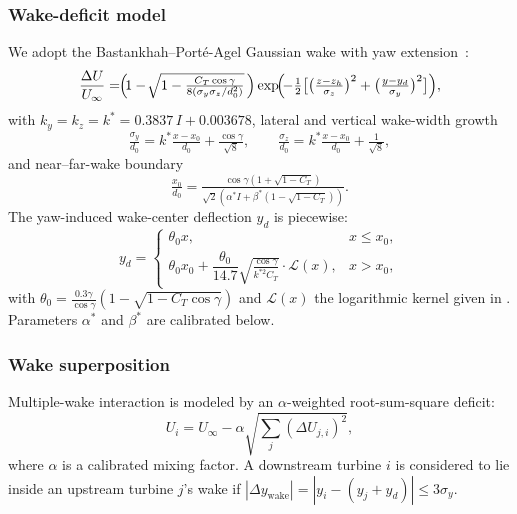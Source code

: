 \documentclass[final,5p,times]{elsarticle}
\begin{document}
\subsubsection{Wake-deficit model}
We adopt the Bastankhah--Port\'e-Agel Gaussian wake with yaw extension~\citep{BastankhahYaw2016}:
\begin{equation}
\frac{\Delta U}{U_\infty}
=\!\!\Bigl(\!1-\!\sqrt{1-\tfrac{C_T\cos\gamma}{8(\sigma_y\sigma_z/d_0^2)}}\,\Bigr)
\exp\!\Bigl(\!-\tfrac{1}{2}\bigl[\bigl(\tfrac{z-z_h}{\sigma_z}\bigr)^{2}
+\bigl(\tfrac{y-y_d}{\sigma_y}\bigr)^{2}\bigr]\Bigr),
\label{eq:wake_deficit}
\end{equation}
with $k_y=k_z=k^*=0.3837\,I+0.003678$, lateral and vertical wake-width growth
\[
\tfrac{\sigma_y}{d_0}=k^*\tfrac{x-x_0}{d_0}+\tfrac{\cos\gamma}{\sqrt 8},\qquad
\tfrac{\sigma_z}{d_0}=k^*\tfrac{x-x_0}{d_0}+\tfrac{1}{\sqrt 8},
\]
and near--far-wake boundary
\[
\tfrac{x_0}{d_0}=\tfrac{\cos\gamma(1+\sqrt{1-C_T})}{\sqrt 2(\alpha^*I+\beta^*(1-\sqrt{1-C_T}))}.
\]
The yaw-induced wake-center deflection $y_d$ is piecewise:
\begin{equation}
y_d=\begin{cases}\theta_0 x,& x\le x_0,\\[2pt]
\theta_0 x_0+\dfrac{\theta_0}{14.7}\!\sqrt{\tfrac{\cos\gamma}{k^{*2}C_T}}\!\cdot\!\mathcal{L}(x), & x>x_0,\end{cases}
\label{eq:yd}
\end{equation}
with $\theta_0=\frac{0.3\gamma}{\cos\gamma}(1-\sqrt{1-C_T\cos\gamma})$ and $\mathcal{L}(x)$ the logarithmic kernel given in \citep{BastankhahYaw2016}. Parameters $\alpha^*$ and $\beta^*$ are calibrated below.

\subsubsection{Wake superposition}
Multiple-wake interaction is modeled by an $\alpha$-weighted root-sum-square deficit:
\begin{equation}
U_i = U_\infty - \alpha\sqrt{\sum_{j}(\Delta U_{j,i})^2},
\label{eq:superposition}
\end{equation}
where $\alpha$ is a calibrated mixing factor. A downstream turbine $i$ is considered to lie inside an upstream turbine $j$'s wake if $|\Delta y_\mathrm{wake}|=|y_i-(y_j+y_d)|\le 3\sigma_y$.
\end{document}
